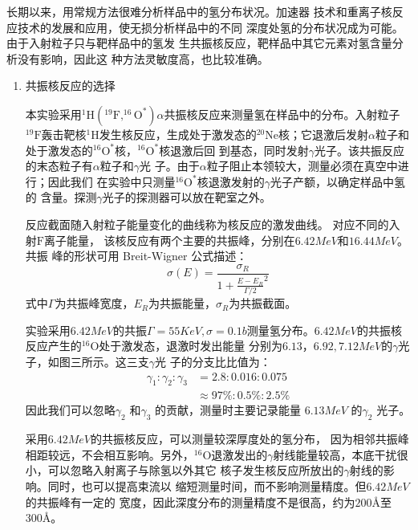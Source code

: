 \documentclass{article}
\begin{document}
长期以来，用常规方法很难分析样品中的氢分布状况。加速器
技术和重离子核反应技术的发展和应用，使无损分析样品中的不同
深度处氢的分布状况成为可能。由于入射粒子只与靶样品中的氢发
生共振核反应，靶样品中其它元素对氢含量分析没有影响，因此这
种方法灵敏度高，也比较准确。
\begin{enumerate}
  \item 共振核反应的选择

  本实验采用$^{1}\text{H}( ^{19}\text{F}, ^{16}\text{O}^* )\alpha$共振核反应来测量氢在样品中的分布。入射粒子$^{19}\text{F}$轰击靶核$^{1}\text{H}$发生核反应，生成处于激发态的$^{20}\text{Ne}$核；它退激后发射$\alpha$粒子和处于激发态的$^{16}\text{O}^*$核，$^{16}\text{O}^*$核退激后回
到基态，同时发射$\gamma$光子。该共振反应的末态粒子有$\alpha$粒子和$\gamma$光
子。由于$\alpha$粒子阻止本领较大，测量必须在真空中进行；因此我们
在实验中只测量$^{16}\text{O}^*$核退激发射的$\gamma$光子产额，以确定样品中氢的
含量。探测$\gamma$光子的探测器可以放在靶室之外。
  
  反应截面随入射粒子能量变化的曲线称为核反应的激发曲线。
对应不同的入射$\text{F}$离子能量，
该核反应有两个主要的共振峰，分别在$6.42\si{MeV}$和$16.44\si{MeV}$。共振
峰的形状可用 Breit-Wigner 公式描述：
\begin{equation}
\sigma(E) = \frac{\sigma_R}{1+\frac{E-E_R}{\Gamma/2}^2}
\end{equation}
式中$\Gamma$为共振峰宽度，$E_R$为共振能量，$\sigma_R$为共振截面。
  
  实验采用$6.42\si{MeV}$的共振$\Gamma=55\si{KeV},\sigma=0.1\si{b}$测量氢分布。$6.42\si{MeV}$的共振核反应产生的$^{16}\text{O}$处于激发态，退激时发出能量
分别为$ 6.13，6.92,7.12\si{MeV} $的$\gamma$光子，如图三所示。这三支$\gamma$光
子的分支比比值为：
\begin{equation}
\begin{aligned}
\gamma_1:\gamma_2:\gamma_3&= 2.8:0.016:0.075\\
&\approx 97\%:0.5\%:2.5\%
\end{aligned}
\end{equation}
因此我们可以忽略$\gamma_2$ 和$\gamma_3$ 的贡献，测量时主要记录能量
$6.13\si{MeV}$ 的$\gamma_2$ 光子。

采用$6.42\si{MeV}$的共振核反应，可以测量较深厚度处的氢分布，
因为相邻共振峰相距较远，不会相互影响。另外，$^{16}\text{O}$退激发出的$\gamma$射线能量较高，本底干扰很小，可以忽略入射离子与除氢以外其它
核子发生核反应所放出的$\gamma$射线的影响。同时，也可以提高束流以
缩短测量时间，而不影响测量精度。但$6.42\si{MeV}$的共振峰有一定的
宽度，因此深度分布的测量精度不是很高，约为$200\text{\AA}$至$300\text{\AA}$。
  

\end{enumerate}
\end{document}
